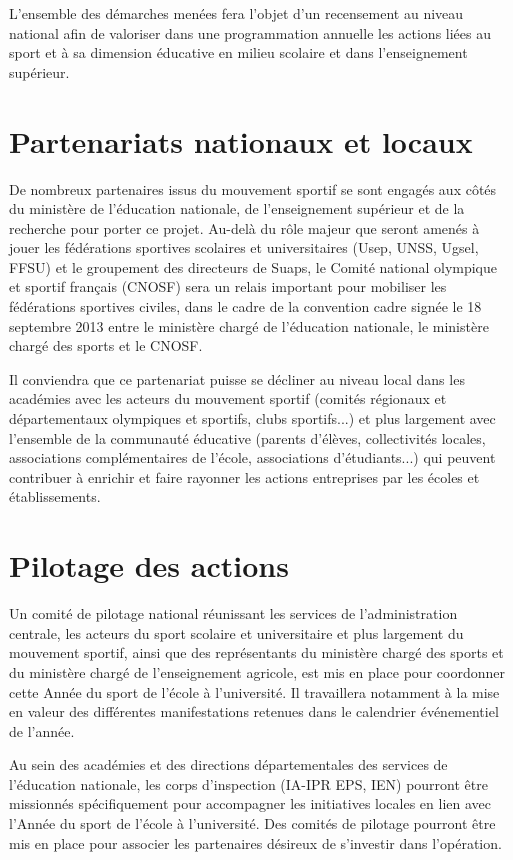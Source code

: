 L’ensemble des démarches menées fera l’objet d’un recensement au niveau national afin de valoriser dans une programmation annuelle les actions liées au sport et à sa dimension éducative en milieu scolaire et dans l’enseignement supérieur.

\section{Partenariats nationaux et locaux}
De nombreux partenaires issus du mouvement sportif se sont engagés aux côtés du ministère de l’éducation nationale, de l’enseignement supérieur et de la recherche pour porter ce projet. Au-delà du rôle majeur que seront amenés à jouer les fédérations sportives scolaires et universitaires (Usep, UNSS, Ugsel, FFSU) et le groupement des directeurs de Suaps, le Comité national olympique et sportif français (CNOSF) sera un relais important pour mobiliser les fédérations sportives civiles, dans le cadre de la convention cadre signée le 18 septembre 2013 entre le ministère chargé de l’éducation nationale, le ministère chargé des sports et le CNOSF.

Il conviendra que ce partenariat puisse se décliner au niveau local dans les académies avec les acteurs du mouvement sportif (comités régionaux et départementaux olympiques et sportifs, clubs sportifs...) et plus largement avec l’ensemble de la communauté éducative (parents d’élèves, collectivités locales, associations complémentaires de l’école, associations d’étudiants...) qui peuvent contribuer à enrichir et faire rayonner les actions entreprises par les écoles et établissements.

\section{Pilotage des actions}
Un comité de pilotage national réunissant les services de l’administration centrale, les acteurs du sport scolaire et universitaire et plus largement du mouvement sportif, ainsi que des représentants du ministère chargé des sports et du ministère chargé de l’enseignement agricole, est mis en place pour coordonner cette Année du sport de l’école à l’université. Il travaillera notamment à la mise en valeur des différentes manifestations retenues dans le calendrier événementiel de l’année.

Au sein des académies et des directions départementales des services de l’éducation nationale, les corps d’inspection (IA-IPR EPS, IEN) pourront être missionnés spécifiquement pour accompagner les initiatives locales en lien avec l’Année du sport de l’école à l’université. Des comités de pilotage pourront être mis en place pour associer les partenaires désireux de s’investir dans l’opération.

